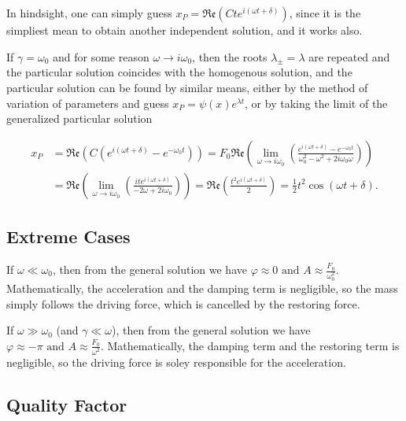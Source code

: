 \documentclass[english,a4paper,12pt]{report}
\begin{document}
In hindsight, one can simply guess \(x_{P} = \mathfrak{Re} (Cte^{i(\omega t+\delta )} )  \), since it is the simpliest mean to obtain another independent solution, and it works also. 

If \(\gamma = \omega _{0} \) and for some reason \(\omega \to i\omega _{0}\), then the roots \(\lambda _{\pm } = \lambda  \) are repeated and the particular solution coincides with the homogenous solution, and the particular solution can be found by similar means, either by the method of variation of parameters and guess \(x_{P} = \psi (x)e^{\lambda t}  \), or by taking the limit of the generalized particular solution

\begin{equation}
    \begin{aligned} 
    x_{P} &= \mathfrak{Re} (C(e^{i(\omega t+\delta )} - e^{-\omega _{0}t } )) = F_0 \mathfrak{Re} \left( \lim_{\omega  \to i\omega _{0} } \left( \frac{e^{i(\omega t+\delta )}-e^{-\omega _{0}t }  }{\omega _{0}^2-\omega ^2+2i\omega _{0}\omega  }  \right) \right) \\ &= \mathfrak{Re} \left( \lim_{\omega  \to i\omega _{0} } \left( \frac{ite^{i(\omega t+\delta )} }{-2\omega + 2i\omega _{0} }  \right) \right) = \mathfrak{Re} \left( \frac{t^2 e^{i(\omega t+\delta )} }{2}  \right) = \frac{1}{2}t^2\cos (\omega t+\delta ). 
    \end{aligned} 
\end{equation}

\subsection{Extreme Cases}

If \(\omega \ll \omega _{0} \), then from the general solution we have \(\displaystyle \varphi \approx 0 \text { and } A \approx \frac{F_0 }{\omega _{0}^2 } \). Mathematically, the acceleration and the damping term is negligible, so the mass simply follows the driving force, which is cancelled by the restoring force. 

If \(\omega \gg \omega _{0}\) (and \(\gamma \ll \omega \)), then from the general solution we have \(\displaystyle \varphi \approx -\pi \text { and } A \approx \frac{F_0 }{\omega ^2}  \). Mathematically, the damping term and the restoring term is negligible, so the driving force is soley responsible for the acceleration.

\subsection{Quality Factor}
\end{document}
